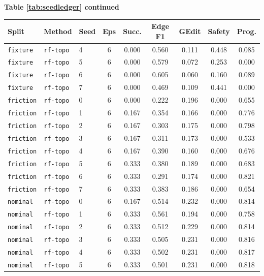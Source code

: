 \documentclass{article}
\begin{document}
\begin{center}
\textbf{Table \ref{tab:seedledger} continued}\\[0.4ex]
\begin{tabular}{lllcccccc}
\toprule
Split & Method & Seed & Eps & Succ. & Edge F1 & GEdit & Safety & Prog. \\
\midrule
\texttt{fixture} & \texttt{rf-topo} & 4 & 6 & 0.000 & 0.560 & 0.111 & 0.448 & 0.085 \\
\texttt{fixture} & \texttt{rf-topo} & 5 & 6 & 0.000 & 0.579 & 0.072 & 0.253 & 0.000 \\
\texttt{fixture} & \texttt{rf-topo} & 6 & 6 & 0.000 & 0.605 & 0.060 & 0.160 & 0.089 \\
\texttt{fixture} & \texttt{rf-topo} & 7 & 6 & 0.000 & 0.469 & 0.109 & 0.441 & 0.000 \\
\texttt{friction} & \texttt{rf-topo} & 0 & 6 & 0.000 & 0.222 & 0.196 & 0.000 & 0.655 \\
\texttt{friction} & \texttt{rf-topo} & 1 & 6 & 0.167 & 0.354 & 0.166 & 0.000 & 0.776 \\
\texttt{friction} & \texttt{rf-topo} & 2 & 6 & 0.167 & 0.303 & 0.175 & 0.000 & 0.798 \\
\texttt{friction} & \texttt{rf-topo} & 3 & 6 & 0.167 & 0.311 & 0.173 & 0.000 & 0.533 \\
\texttt{friction} & \texttt{rf-topo} & 4 & 6 & 0.167 & 0.390 & 0.160 & 0.000 & 0.676 \\
\texttt{friction} & \texttt{rf-topo} & 5 & 6 & 0.333 & 0.380 & 0.189 & 0.000 & 0.683 \\
\texttt{friction} & \texttt{rf-topo} & 6 & 6 & 0.333 & 0.291 & 0.174 & 0.000 & 0.821 \\
\texttt{friction} & \texttt{rf-topo} & 7 & 6 & 0.333 & 0.383 & 0.186 & 0.000 & 0.654 \\
\texttt{nominal} & \texttt{rf-topo} & 0 & 6 & 0.167 & 0.514 & 0.232 & 0.000 & 0.814 \\
\texttt{nominal} & \texttt{rf-topo} & 1 & 6 & 0.333 & 0.561 & 0.194 & 0.000 & 0.758 \\
\texttt{nominal} & \texttt{rf-topo} & 2 & 6 & 0.333 & 0.512 & 0.229 & 0.000 & 0.814 \\
\texttt{nominal} & \texttt{rf-topo} & 3 & 6 & 0.333 & 0.505 & 0.231 & 0.000 & 0.816 \\
\texttt{nominal} & \texttt{rf-topo} & 4 & 6 & 0.333 & 0.502 & 0.231 & 0.000 & 0.817 \\
\texttt{nominal} & \texttt{rf-topo} & 5 & 6 & 0.333 & 0.501 & 0.231 & 0.000 & 0.818 \\

\end{tabular}
\end{center}
\end{document}

